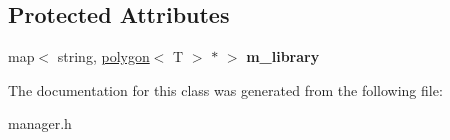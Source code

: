 \subsection*{Protected Attributes}
\begin{DoxyCompactItemize}
\item 
\hypertarget{classpolygons_1_1manager_a4c56d352b76872309478d426ea415d25}{map$<$ string, \hyperlink{classpolygons_1_1polygon}{polygon}$<$ T $>$ $\ast$ $>$ {\bfseries m\-\_\-library}}\label{classpolygons_1_1manager_a4c56d352b76872309478d426ea415d25}

\end{DoxyCompactItemize}


The documentation for this class was generated from the following file\-:\begin{DoxyCompactItemize}
\item 
manager.\-h\end{DoxyCompactItemize}
